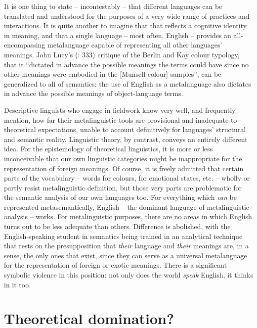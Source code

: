 \documentclass[output=paper]{langscibook}
\begin{document}
It is one thing to state – incontestably – that different languages can be translated and understood for the purposes of a very wide range of practices and interactions. It is quite another to imagine that that reflects a cognitive identity in meaning, and that a single language – most often, English – provides an all-encompassing metalanguage capable of representing all other languages' meanings. John Lucy's (\citeyear{Lucy1997}: 333) critique of the Berlin and Kay colour typology, that it ``dictated in advance the possible meanings the terms could have since no other meanings were embodied in the [Munsell colour] samples'', can be generalized to all of semantics: the use of English as a metalanguage also dictates in advance the possible meanings of object-language terms.

Descriptive linguists who engage in fieldwork know very well, and frequently mention, how far their metalinguistic tools are provisional and inadequate to theoretical expectations, unable to account definitively for languages' structural and semantic reality. Linguistic theory, by contrast, conveys an entirely different idea. For the epistemology of theoretical linguistics, it is more or less inconceivable that our own linguistic categories might be inappropriate for the representation of foreign meanings. Of course, it is freely admitted that certain parts of the vocabulary – words for colours, for emotional states, etc. – wholly or partly resist metalinguistic definition, but those very parts are problematic for the semantic analysis of our own languages too.  For everything which \emph{can} be represented metasemantically, English – the dominant language of metalinguistic analysis – works. For metalinguistic purposes, there are no areas in which English turns out to be less adequate than others. Difference is abolished, with the English-speaking student in semantics being trained in an analytical technique that rests on the presupposition that \emph{their} language and \emph{their} meanings are, in a sense, the only ones that exist, since they can serve as a universal metalanguage for the representation of foreign or exotic meanings. There is a significant symbolic violence in this position: not only does the world \emph{speak} English, it thinks in it too.

\section{Theoretical domination?}
\label{sec:riemer:theoreticaldomination}
\end{document}
